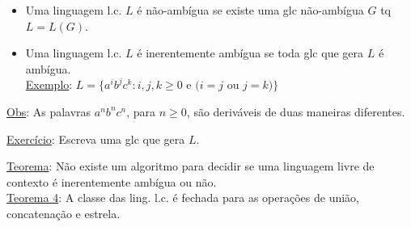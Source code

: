 \documentclass{article}
\begin{document}
\newtheorem{thm}{Theorem}

\begin{itemize}
    \item Uma linguagem l.c. $L$ é não-ambígua se existe uma glc não-ambígua $G$ tq $ L = L(G) $.
    \item Uma linguagem l.c. $L$ é inerentemente ambígua se toda glc que gera $L$ é ambígua.\\
            \underline{Exemplo}: $ L = \{ a^ib^jc^k : i,j,k \geq 0 $ e $ ( i = j $ ou $ j = k ) \} $
\end{itemize}
    
    \underline{Obs}: As palavras $ a^nb^nc^n $, para $ n \geq 0 $, são deriváveis de duas maneiras diferentes.
    
    \underline{Exercício}: Escreva uma glc que gera $L$.
    
    \underline{Teorema}: Não existe um algoritmo para decidir se uma linguagem livre de contexto é
                            inerentemente ambígua ou não.\\
                            
    \underline{Teorema 4}: A classe das ling. l.c. é fechada para as operações de união, concatenação
                            e estrela.
                            
\end{document}
